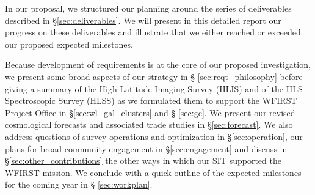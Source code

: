 \begin{summary}
In our proposal, we structured our planning around the series of deliverables
described in \S \ref{sec:deliverables}. We will present in this detailed report our progress on
these deliverables and illustrate that we either reached or exceeded our proposed
expected milestones.

Because development of requirements is at the core of our proposed
investigation, we present some broad aspects of our strategy in \S
\ref{sec:reqt_philosophy} before giving a summary of the High Latitude Imaging
Survey (HLIS) and of the HLS Spectroscopic Survey (HLSS) as we formulated them
to support the WFIRST Project Office in \S \ref{sec:wl_gal_clusters} and \S
\ref{sec:gc}. We present our revised cosmological forecasts and associated trade studies in
\S \ref{sec:forecast}. We also address questions of survey operations and
optimization in \S \ref{sec:operation}, our plans for broad community engagement
in \S \ref{sec:engagement} and discuss in \S \ref{sec:other_contributions} the
other ways in which our SIT supported the WFIRST mission. We conclude with a
quick outline of the expected milestones for the coming year in \S
\ref{sec:workplan}.

\end{summary}



